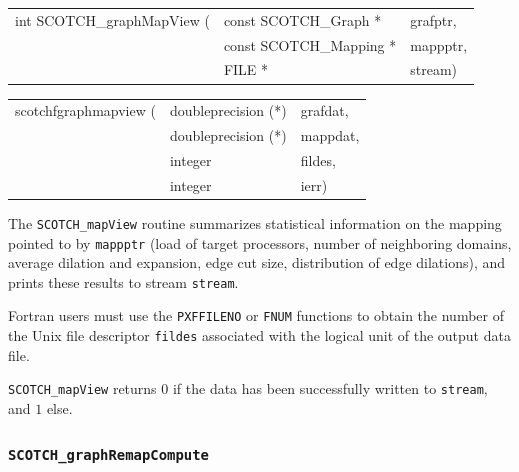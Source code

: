 \begin{itemize}
\progsyn

{\tt\begin{tabular}{l@{}ll}
int SCOTCH\_graphMapView ( & const SCOTCH\_Graph *   & grafptr, \\
                           & const SCOTCH\_Mapping * & mappptr, \\
                           & FILE *                  & stream)
\end{tabular}}

{\tt\begin{tabular}{l@{}ll}
scotchfgraphmapview ( & doubleprecision (*) & grafdat, \\
                      & doubleprecision (*) & mappdat, \\
                      & integer             & fildes,  \\
                      & integer             & ierr)
\end{tabular}}

\progdes

The {\tt SCOTCH\_mapView} routine summarizes statistical information
on the mapping pointed to by {\tt mappptr} (load of target processors,
number of neighboring domains, average dilation and expansion, edge
cut size, distribution of edge dilations), and prints these results to
stream {\tt stream}.

Fortran users must use the {\tt PXFFILENO} or {\tt FNUM} functions to
obtain the number of the Unix file descriptor {\tt fildes} associated
with the logical unit of the output data file.

\progret

{\tt SCOTCH\_mapView} returns $0$ if the data has been successfully
written to {\tt stream}, and $1$ else.
\end{itemize}

\subsubsection{{\tt SCOTCH\_graphRemapCompute}}

